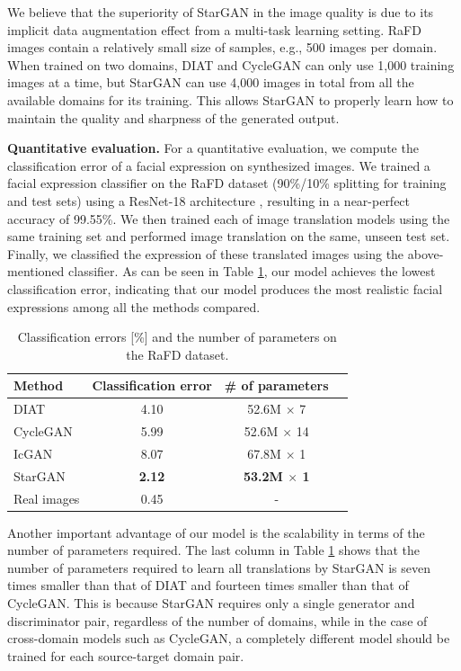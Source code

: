 \documentclass[10pt,twocolumn,letterpaper]{article}
\begin{document}
We believe that the superiority of StarGAN in the image quality is due to its implicit data augmentation effect from a multi-task learning setting. RaFD images contain a relatively small size of samples, e.g., 500 images per domain. When trained on two domains, DIAT and CycleGAN can only use 1,000 training images at a time, but StarGAN can use 4,000 images in total from all the available domains for its training. This allows StarGAN to properly learn how to maintain the quality and sharpness of the generated output.

\medskip

\noindent \textbf{Quantitative evaluation.} For a quantitative evaluation, we compute the classification error of a facial expression on synthesized images. We trained a facial expression classifier on the RaFD dataset (90\%/10\% splitting for training and test sets) using a ResNet-18 architecture \cite{he2016deep}, resulting in a near-perfect accuracy of 99.55\%. We then trained each of image translation models using the same training set and performed image translation on the same, unseen test set. Finally, we classified the expression of these translated images using the above-mentioned classifier. As can be seen in Table \ref{table3}, our model achieves the lowest classification error, indicating that our model produces the most realistic facial expressions among all the methods compared.

\begin{table}[ht]
\begin{center}
\begin{tabular}{l c c c}
Method & Classification error & \# of parameters \\
\hline
DIAT & 4.10 & 52.6M $\times$ 7 \\
CycleGAN & 5.99 & 52.6M $\times$ 14\\
IcGAN & 8.07 & 67.8M $\times$ 1\\
StarGAN & \textbf{2.12} & \textbf{53.2M $\times$ 1} \\
\hline
Real images & 0.45 & - \\
\end{tabular}
\end{center}
\caption{Classification errors [\%] and the number of parameters on the RaFD dataset. 
}
\label{table3}
\end{table}

Another important advantage of our model is the scalability in terms of the number of parameters required. The last column in Table \ref{table3} shows that the number of parameters required to learn all translations by StarGAN is seven times smaller than that of DIAT and fourteen times smaller than that of CycleGAN. This is because StarGAN requires only a single generator and discriminator pair, regardless of the number of domains, while in the case of cross-domain models such as CycleGAN, a completely different model should be trained for each source-target domain pair. 
\end{document}
